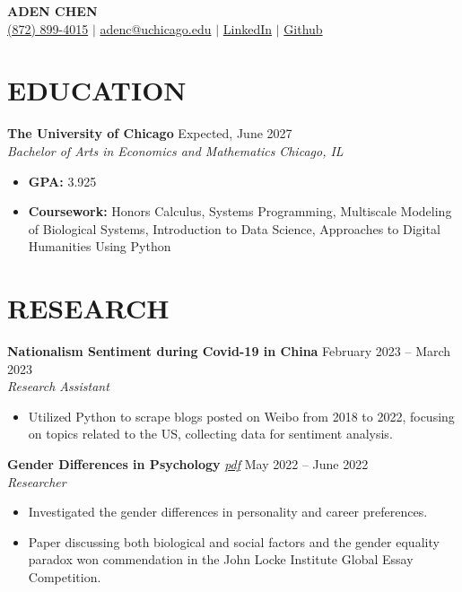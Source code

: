 \documentclass[letterpaper, 9pt]{extarticle}
\begin{document}
\pagestyle{empty}

\begin{center}
    \textbf{\Large ADEN CHEN} \\
    \href{tel:(872) 899-4015}{\faMobile\space (872) 899-4015}
    $|$
    \href{mailto:adenc@uchicago.edu}{\faAt\space adenc@uchicago.edu}
    $|$
    \href{https://www.linkedin.com/in/aden-chen-45a924221/}{\faLinkedinSquare \space LinkedIn}
    $|$
    \href{https://github.com/AdenChen27}{\faGithub\space Github}
\end{center}

\section*{EDUCATION}
\noindent
\textbf{The University of Chicago} \hfill Expected, June 2027 \\ 
\textit{Bachelor of Arts in Economics and Mathematics} \hfill \textit{Chicago, IL}
\begin{itemize}
    \item\textbf{GPA:} 3.925 
    \item\textbf{Coursework:} Honors Calculus, Systems Programming, Multiscale Modeling of Biological Systems, Introduction to Data Science, Approaches to Digital Humanities Using Python
\end{itemize}

\section*{RESEARCH}
\noindent
\textbf{Nationalism Sentiment during Covid-19 in China} 
\hfill February 2023 -- March 2023 \\
\textit{Research Assistant} 
\begin{itemize}
    \item Utilized Python to scrape blogs posted on Weibo from 2018 to 2022, focusing on topics related to the US, collecting data for sentiment analysis.
\end{itemize}

\noindent
\textbf{Gender Differences in Psychology}
\emph{\href{https://drive.google.com/file/d/19cO9fOI9KPIAT2OV0WPENLVXvrM-A7fZ/view?usp=sharing}{\color{blue} pdf}} 
\hfill May 2022 -- June 2022 \\
\textit{Researcher} 
\begin{itemize}
    \item Investigated the gender differences in personality and career preferences. 
    \item Paper discussing both biological and social factors and the gender equality paradox won commendation in the John Locke Institute Global Essay Competition.
\end{itemize}
\end{document}
